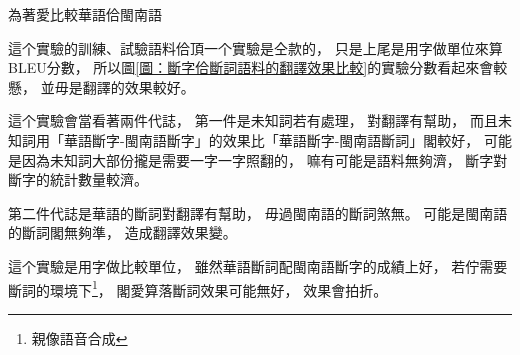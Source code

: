 為著愛比較華語佮閩南語

這个實驗的訓練、試驗語料佮頂一个實驗是仝款的，
只是上尾是用字做單位來算BLEU分數，
所以圖\ref{圖：斷字佮斷詞語料的翻譯效果比較}的實驗分數看起來會較懸，
並毋是翻譯的效果較好。

這个實驗會當看著兩件代誌，
第一件是未知詞若有處理，
對翻譯有幫助，
而且未知詞用「華語斷字-閩南語斷字」的效果比「華語斷字-閩南語斷詞」閣較好，
可能是因為未知詞大部份攏是需要一字一字照翻的，
嘛有可能是語料無夠濟，
斷字對斷字的統計數量較濟。

第二件代誌是華語的斷詞對翻譯有幫助，
毋過閩南語的斷詞煞無。
可能是閩南語的斷詞閣無夠準，
造成翻譯效果變。

這个實驗是用字做比較單位，
雖然華語斷詞配閩南語斷字的成績上好，
若佇需要斷詞的環境下\footnote{親像語音合成}，
閣愛算落斷詞效果可能無好，
效果會拍折。